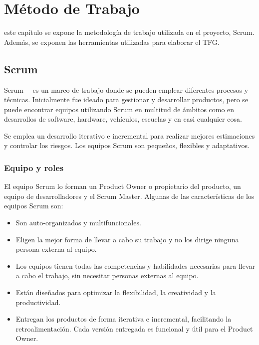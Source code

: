 \chapter{Método de Trabajo}
\label{chap:metodo}

 este capítulo se expone la metodología de trabajo utilizada en el proyecto, Scrum. Además,
se exponen las herramientas utilizadas para elaborar el \acs{TFG}.

\section{Scrum}

Scrum~\cite{SCRUM}~\cite{SCRUMXP} es un marco de trabajo donde se pueden emplear diferentes procesos y técnicas. Inicialmente 
fue ideado para gestionar y desarrollar productos, pero se puede encontrar equipos utilizando Scrum 
en multitud de ámbitos como en desarrollos de software, hardware, vehículos, escuelas y en casi cualquier 
cosa.

Se emplea un desarrollo iterativo e incremental para realizar mejores estimaciones y controlar 
los riesgos. Los equipos Scrum son pequeños, flexibles y adaptativos. 

\subsection{Equipo y roles}

El equipo Scrum lo forman un Product Owner o propietario del producto, un equipo de desarrolladores y el Scrum Master. Algunas
de las características de los equipos Scrum son:

\begin{itemize}
	\item Son auto-organizados y multifuncionales.
	\item Eligen la mejor forma de llevar a cabo su trabajo y no los dirige ninguna persona externa al equipo.
	\item Los equipos tienen todas las competencias y habilidades necesarias para llevar a cabo el trabajo,
	sin necesitar personas externas al equipo.
	\item Están diseñados para optimizar la flexibilidad, la creatividad y la productividad.
	\item Entregan los productos de forma iterativa e incremental, facilitando la retroalimentación. Cada versión entregada
	es funcional y útil para el Product Owner.
\end{itemize}

